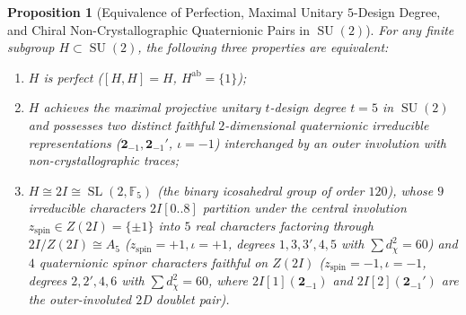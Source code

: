 \documentclass[11pt,a4paper]{article}
\newtheorem{proposition}[theorem]{Proposition}
\theoremstyle{definition}
\theoremstyle{remark}
\newcommand{\F}{\mathbb{F}}
\newcommand{\SU}{\operatorname{SU}}
\newcommand{\SL}{\operatorname{SL}}
\begin{document}
\begin{proposition}[Equivalence of Perfection, Maximal Unitary {$5$-Design} Degree, and Chiral Non-Crystallographic Quaternionic Pairs in {$\SU(2)$}]
\label{prop:chiral_noncrystallographic}
For any finite subgroup $H \subset \SU(2)$, the following three properties are equivalent:
\begin{enumerate}
    \item $H$ is perfect ($[H, H] = H$, $H^{\mathrm{ab}} = \{1\}$);
    \item $H$ achieves the maximal projective unitary $t$-design degree $t = 5$ in $\SU(2)$ and possesses two distinct faithful $2$-dimensional quaternionic irreducible representations ($\mathbf{2}_{-1}, \mathbf{2}_{-1}'$, $\iota = -1$) interchanged by an outer involution with non-crystallographic traces;
    \item $H \cong 2I \cong \SL(2,\F_5)$ (the binary icosahedral group of order $120$), whose $9$ irreducible characters $2I[0..8]$ partition under the central involution $z_{\mathrm{spin}} \in Z(2I) = \{\pm 1\}$ into $5$ real characters factoring through $2I/Z(2I) \cong A_5$ ($z_{\mathrm{spin}} = +1, \iota = +1$, degrees $1, 3, 3', 4, 5$ with $\sum d_\chi^2 = 60$) and $4$ quaternionic spinor characters faithful on $Z(2I)$ ($z_{\mathrm{spin}} = -1, \iota = -1$, degrees $2, 2', 4, 6$ with $\sum d_\chi^2 = 60$, where $2I[1](\mathbf{2}_{-1})$ and $2I[2](\mathbf{2}_{-1}')$ are the outer-involuted $2$D doublet pair).
\end{enumerate}
\end{proposition}
\end{document}

